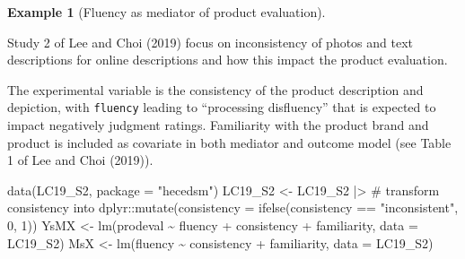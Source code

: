 \documentclass[
  11pt,
  letterpaper,
]{scrbook}
\newenvironment{Shaded}{\begin{snugshade}}{\end{snugshade}}
\newcommand{\AttributeTok}[1]{\textcolor[rgb]{0.40,0.45,0.13}{#1}}
\newcommand{\CommentTok}[1]{\textcolor[rgb]{0.37,0.37,0.37}{#1}}
\newcommand{\DecValTok}[1]{\textcolor[rgb]{0.68,0.00,0.00}{#1}}
\newcommand{\FunctionTok}[1]{\textcolor[rgb]{0.28,0.35,0.67}{#1}}
\newcommand{\NormalTok}[1]{\textcolor[rgb]{0.00,0.23,0.31}{#1}}
\newcommand{\OtherTok}[1]{\textcolor[rgb]{0.00,0.23,0.31}{#1}}
\newcommand{\SpecialCharTok}[1]{\textcolor[rgb]{0.37,0.37,0.37}{#1}}
\newcommand{\StringTok}[1]{\textcolor[rgb]{0.13,0.47,0.30}{#1}}
\theoremstyle{definition}
\newtheorem{example}{Example}[chapter]
\theoremstyle{definition}
\theoremstyle{remark}
\begin{document}
\begin{example}[Fluency as mediator of product
evaluation]\protect\hypertarget{exm-inconsistency}{}\label{exm-inconsistency}

Study 2 of Lee and Choi (2019) focus on inconsistency of photos and text
descriptions for online descriptions and how this impact the product
evaluation.

The experimental variable is the consistency of the product description
and depiction, with \texttt{fluency} leading to ``processing
disfluency'' that is expected to impact negatively judgment ratings.
Familiarity with the product brand and product is included as covariate
in both mediator and outcome model (see Table 1 of Lee and Choi (2019)).

\begin{Shaded}
\begin{Highlighting}[]
\FunctionTok{data}\NormalTok{(LC19\_S2, }\AttributeTok{package =} \StringTok{"hecedsm"}\NormalTok{)}
\NormalTok{LC19\_S2 }\OtherTok{\textless{}{-}}\NormalTok{ LC19\_S2 }\SpecialCharTok{|\textgreater{}} \CommentTok{\# transform consistency into }
\NormalTok{ dplyr}\SpecialCharTok{::}\FunctionTok{mutate}\NormalTok{(}\AttributeTok{consistency =} \FunctionTok{ifelse}\NormalTok{(consistency }\SpecialCharTok{==} \StringTok{"inconsistent"}\NormalTok{, }\DecValTok{0}\NormalTok{, }\DecValTok{1}\NormalTok{))}
\NormalTok{YsMX }\OtherTok{\textless{}{-}} \FunctionTok{lm}\NormalTok{(prodeval }\SpecialCharTok{\textasciitilde{}}\NormalTok{ fluency }\SpecialCharTok{+}\NormalTok{ consistency }\SpecialCharTok{+}\NormalTok{ familiarity,}
           \AttributeTok{data =}\NormalTok{ LC19\_S2)}
\NormalTok{MsX }\OtherTok{\textless{}{-}} \FunctionTok{lm}\NormalTok{(fluency }\SpecialCharTok{\textasciitilde{}}\NormalTok{ consistency }\SpecialCharTok{+}\NormalTok{ familiarity,}
           \AttributeTok{data =}\NormalTok{ LC19\_S2)}
\end{Highlighting}
\end{Shaded}

\begin{table}

\caption{\label{tbl-coefsmediation}Model coefficients}

\begin{minipage}{0.50\linewidth}


\end{minipage}
\end{table}
\end{example}
\end{document}
